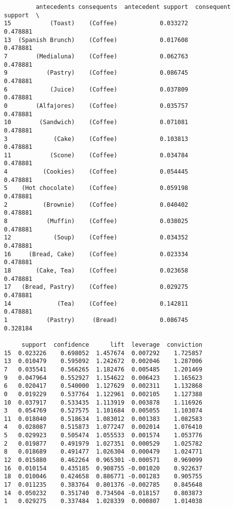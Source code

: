 \documentclass[11pt]{article}
\begin{document}
    
    \begin{verbatim}
         antecedents consequents  antecedent support  consequent support  \
15           (Toast)    (Coffee)            0.033272            0.478881   
13  (Spanish Brunch)    (Coffee)            0.017608            0.478881   
7        (Medialuna)    (Coffee)            0.062763            0.478881   
9           (Pastry)    (Coffee)            0.086745            0.478881   
6            (Juice)    (Coffee)            0.037809            0.478881   
0        (Alfajores)    (Coffee)            0.035757            0.478881   
10        (Sandwich)    (Coffee)            0.071081            0.478881   
3             (Cake)    (Coffee)            0.103813            0.478881   
11           (Scone)    (Coffee)            0.034784            0.478881   
4          (Cookies)    (Coffee)            0.054445            0.478881   
5    (Hot chocolate)    (Coffee)            0.059198            0.478881   
2          (Brownie)    (Coffee)            0.040402            0.478881   
8           (Muffin)    (Coffee)            0.038025            0.478881   
12            (Soup)    (Coffee)            0.034352            0.478881   
16     (Bread, Cake)    (Coffee)            0.023334            0.478881   
18       (Cake, Tea)    (Coffee)            0.023658            0.478881   
17   (Bread, Pastry)    (Coffee)            0.029275            0.478881   
14             (Tea)    (Coffee)            0.142811            0.478881   
1           (Pastry)     (Bread)            0.086745            0.328184   

     support  confidence      lift  leverage  conviction  
15  0.023226    0.698052  1.457674  0.007292    1.725857  
13  0.010479    0.595092  1.242672  0.002046    1.287006  
7   0.035541    0.566265  1.182476  0.005485    1.201469  
9   0.047964    0.552927  1.154622  0.006423    1.165623  
6   0.020417    0.540000  1.127629  0.002311    1.132868  
0   0.019229    0.537764  1.122961  0.002105    1.127388  
10  0.037917    0.533435  1.113919  0.003878    1.116926  
3   0.054769    0.527575  1.101684  0.005055    1.103074  
11  0.018040    0.518634  1.083012  0.001383    1.082583  
4   0.028087    0.515873  1.077247  0.002014    1.076410  
5   0.029923    0.505474  1.055533  0.001574    1.053776  
2   0.019877    0.491979  1.027351  0.000529    1.025782  
8   0.018689    0.491477  1.026304  0.000479    1.024771  
12  0.015880    0.462264  0.965301 -0.000571    0.969099  
16  0.010154    0.435185  0.908755 -0.001020    0.922637  
18  0.010046    0.424658  0.886771 -0.001283    0.905755  
17  0.011235    0.383764  0.801376 -0.002785    0.845648  
14  0.050232    0.351740  0.734504 -0.018157    0.803873  
1   0.029275    0.337484  1.028339  0.000807    1.014038  
    \end{verbatim}
\end{document}
